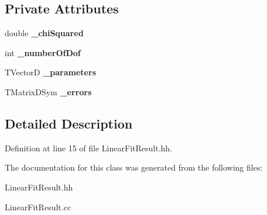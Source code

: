 \subsection*{Private Attributes}
\begin{DoxyCompactItemize}
\item 
double {\bfseries \_\-chiSquared}\label{classTBTrack_1_1LinearFitResult_a009140f1916c5f9fffbdde89e000fe94}

\item 
int {\bfseries \_\-numberOfDof}\label{classTBTrack_1_1LinearFitResult_a2a4b4553ede2fc2363e4beab085404c8}

\item 
TVectorD {\bfseries \_\-parameters}\label{classTBTrack_1_1LinearFitResult_aab3a876556b7afa7eb0492e30a51b56d}

\item 
TMatrixDSym {\bfseries \_\-errors}\label{classTBTrack_1_1LinearFitResult_a71acc0645f990d05042ccd962cf36ef7}

\end{DoxyCompactItemize}


\subsection{Detailed Description}


Definition at line 15 of file LinearFitResult.hh.

The documentation for this class was generated from the following files:\begin{DoxyCompactItemize}
\item 
LinearFitResult.hh\item 
LinearFitResult.cc\end{DoxyCompactItemize}
